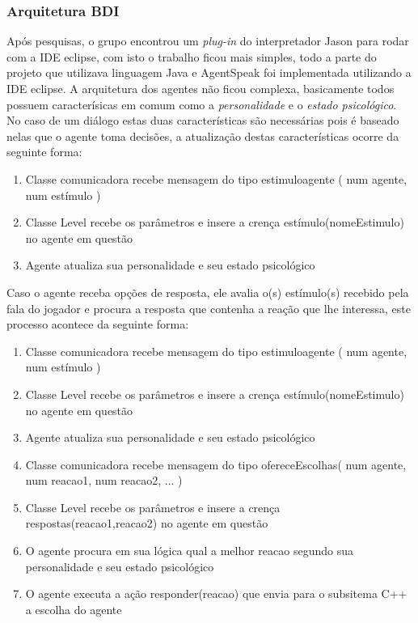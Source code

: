 \subsubsection{Arquitetura BDI}
Após pesquisas, o grupo encontrou um \emph{plug-in} do interpretador Jason para rodar com a IDE eclipse, com isto o trabalho ficou mais simples, todo a parte do projeto que utilizava linguagem Java e AgentSpeak foi implementada utilizando a IDE eclipse.
A arquitetura dos agentes não ficou complexa, basicamente todos possuem caracterísicas em comum como a \emph{personalidade} e o \emph{estado psicológico}. No caso de um diálogo estas duas características são necessárias pois é baseado nelas que o agente toma decisões, a atualização destas características ocorre da seguinte forma:
\begin{enumerate} 
\item Classe comunicadora recebe mensagem do tipo estimuloagente ( num agente, num estímulo )
\item Classe Level recebe os parâmetros e insere a crença estímulo(nomeEstimulo) no agente em questão
\item Agente atualiza sua personalidade e seu estado psicológico
\end{enumerate}

Caso o agente receba opções de resposta, ele avalia o(s) estímulo(s) recebido pela fala do jogador e procura a resposta que contenha a reação que lhe interessa, este processo acontece da seguinte forma:

\begin{enumerate} 
\item Classe comunicadora recebe mensagem do tipo estimuloagente ( num agente, num estímulo )
\item Classe Level recebe os parâmetros e insere a crença estímulo(nomeEstimulo) no agente em questão
\item Agente atualiza sua personalidade e seu estado psicológico
\item Classe comunicadora recebe mensagem do tipo ofereceEscolhas( num agente, num reacao1, num reacao2, ... )
\item Classe Level recebe os parâmetros e insere a crença respostas(reacao1,reacao2) no agente em questão
\item O agente procura em sua lógica qual a melhor reacao segundo sua personalidade e seu estado psicológico 
\item O agente executa a ação responder(reacao) que envia para o subsitema C++ a escolha do agente
\end{enumerate}

